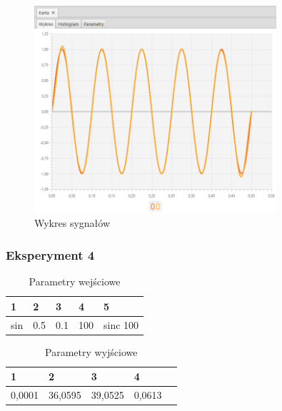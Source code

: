 \documentclass[12pt]{article}
\begin{document}
{{{                \begin{figure}[H]
                    \centering
                    \includegraphics[width=0.8\textwidth]{img/result/experiment1/03/data_draw_original_chart_recon_output_130136.png}
                    \caption{Wykres sygnałów}
                \end{figure}
            }
            \newpage

            \subsubsection{Eksperyment 4} {
                \begin{table}[H]
                    \centering
                    \begin{tabular}{|l|l|l|l|l|}
                        \hline
                        1 & 2 & 3 & 4 & 5   \\ \hline
                        sin & 0.5 & 0.1 & 100 & sinc 100  \\ \hline
                    \end{tabular}
                    \caption{Parametry wejściowe}
                \end{table}

                \begin{table}[H]
                    \centering
                    \begin{tabular}{|l|l|l|l|l|}
                        \hline
                        1 & 2 & 3 & 4   \\ \hline
                        0,0001 & 36,0595 & 39,0525 & 0,0613   \\ \hline
                    \end{tabular}
                    \caption{Parametry wyjściowe}
                \end{table}


}}}
\end{document}
